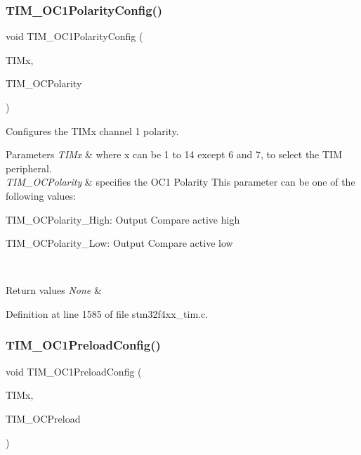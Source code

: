 \subsubsection{\texorpdfstring{T\+I\+M\+\_\+\+O\+C1\+Polarity\+Config()}{TIM\_OC1PolarityConfig()}}
{\footnotesize\ttfamily void T\+I\+M\+\_\+\+O\+C1\+Polarity\+Config (\begin{DoxyParamCaption}\item[{\hyperlink{struct_t_i_m___type_def}{T\+I\+M\+\_\+\+Type\+Def} $\ast$}]{T\+I\+Mx,  }\item[{uint16\+\_\+t}]{T\+I\+M\+\_\+\+O\+C\+Polarity }\end{DoxyParamCaption})}



Configures the T\+I\+Mx channel 1 polarity. 


\begin{DoxyParams}{Parameters}
{\em T\+I\+Mx} & where x can be 1 to 14 except 6 and 7, to select the T\+IM peripheral. \\
\hline
{\em T\+I\+M\+\_\+\+O\+C\+Polarity} & specifies the O\+C1 Polarity This parameter can be one of the following values\+: \begin{DoxyItemize}
\item T\+I\+M\+\_\+\+O\+C\+Polarity\+\_\+\+High\+: Output Compare active high \item T\+I\+M\+\_\+\+O\+C\+Polarity\+\_\+\+Low\+: Output Compare active low \end{DoxyItemize}
\\
\hline
\end{DoxyParams}

\begin{DoxyRetVals}{Return values}
{\em None} & \\
\hline
\end{DoxyRetVals}


Definition at line 1585 of file stm32f4xx\+\_\+tim.\+c.

\mbox{\label{group___t_i_m___group2_ga60e6c29ad8f919bef616cf8e3306dd64}} 
\subsubsection{\texorpdfstring{T\+I\+M\+\_\+\+O\+C1\+Preload\+Config()}{TIM\_OC1PreloadConfig()}}
{\footnotesize\ttfamily void T\+I\+M\+\_\+\+O\+C1\+Preload\+Config (\begin{DoxyParamCaption}\item[{\hyperlink{struct_t_i_m___type_def}{T\+I\+M\+\_\+\+Type\+Def} $\ast$}]{T\+I\+Mx,  }\item[{uint16\+\_\+t}]{T\+I\+M\+\_\+\+O\+C\+Preload }\end{DoxyParamCaption})}




